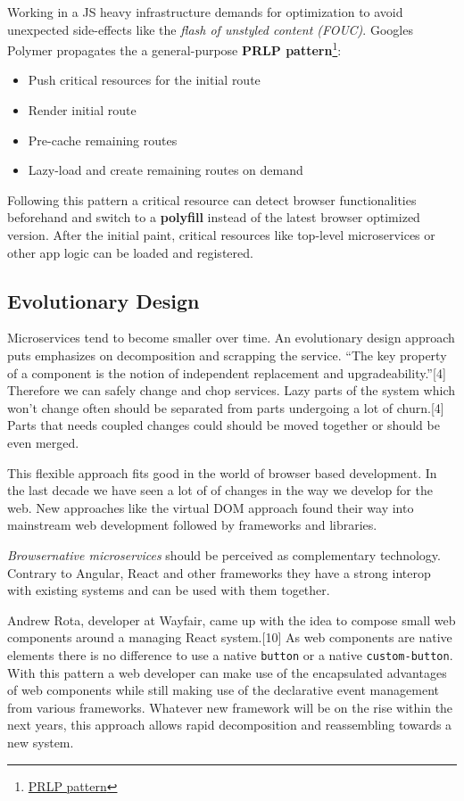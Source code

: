 \documentclass[]{article}
\providecommand{\tightlist}{%
  \setlength{\itemsep}{0pt}\setlength{\parskip}{0pt}}
\begin{document}
Working in a JS heavy infrastructure demands for optimization to avoid
unexpected side-effects like the \emph{flash of unstyled content
(FOUC)}. Googles Polymer propagates the a general-purpose \textbf{PRLP
pattern}\footnote{\href{https://www.polymer-project.org/1.0/toolbox/server}{PRLP
  pattern}}:

\begin{itemize}
\tightlist
\item
  Push critical resources for the initial route
\item
  Render initial route
\item
  Pre-cache remaining routes
\item
  Lazy-load and create remaining routes on demand
\end{itemize}

Following this pattern a critical resource can detect browser
functionalities beforehand and switch to a \textbf{polyfill} instead of
the latest browser optimized version. After the initial paint, critical
resources like top-level microservices or other app logic can be loaded
and registered.

\subsection{Evolutionary Design}\label{evolutionary-design}

Microservices tend to become smaller over time. An evolutionary design
approach puts emphasizes on decomposition and scrapping the service.
``The key property of a component is the notion of independent
replacement and upgradeability.''{[}4{]} Therefore we can safely change
and chop services. Lazy parts of the system which won't change often
should be separated from parts undergoing a lot of churn.{[}4{]} Parts
that needs coupled changes could should be moved together or should be
even merged.

This flexible approach fits good in the world of browser based
development. In the last decade we have seen a lot of of changes in the
way we develop for the web. New approaches like the virtual DOM approach
found their way into mainstream web development followed by frameworks
and libraries.

\emph{Browsernative microservices} should be perceived as complementary
technology. Contrary to Angular, React and other frameworks they have a
strong interop with existing systems and can be used with them together.

Andrew Rota, developer at Wayfair, came up with the idea to compose
small web components around a managing React system.{[}10{]} As web
components are native elements there is no difference to use a native
\texttt{button} or a native \texttt{custom-button}. With this pattern a
web developer can make use of the encapsulated advantages of web
components while still making use of the declarative event management
from various frameworks. Whatever new framework will be on the rise
within the next years, this approach allows rapid decomposition and
reassembling towards a new system.
\end{document}
